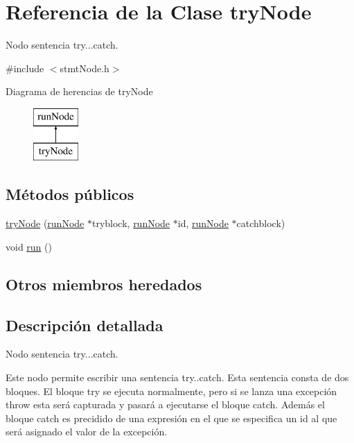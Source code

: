 \hypertarget{classtryNode}{\section{Referencia de la Clase try\-Node}
\label{classtryNode}
}


Nodo sentencia try...catch.  




{\ttfamily \#include $<$stmt\-Node.\-h$>$}

Diagrama de herencias de try\-Node\begin{figure}[H]
\begin{center}
\leavevmode
\includegraphics[height=2.000000cm]{classtryNode}
\end{center}
\end{figure}
\subsection*{Métodos públicos}
\begin{DoxyCompactItemize}
\item 
\hyperlink{classtryNode_aee8959030855b0546d9b1dca2ac624b4}{try\-Node} (\hyperlink{classrunNode}{run\-Node} $\ast$tryblock, \hyperlink{classrunNode}{run\-Node} $\ast$id, \hyperlink{classrunNode}{run\-Node} $\ast$catchblock)
\item 
void \hyperlink{classtryNode_ac52c2062053f0a58c92d847ec2662d2e}{run} ()
\end{DoxyCompactItemize}
\subsection*{Otros miembros heredados}


\subsection{Descripción detallada}
Nodo sentencia try...catch. 

Este nodo permite escribir una sentencia try..catch. Esta sentencia consta de dos bloques. El bloque try se ejecuta normalmente, pero si se lanza una excepción throw esta será capturada y pasará a ejecutarse el bloque catch. Además el bloque catch es precidido de una expresión en el que se especifica un id al que será asignado el valor de la excepción. 

